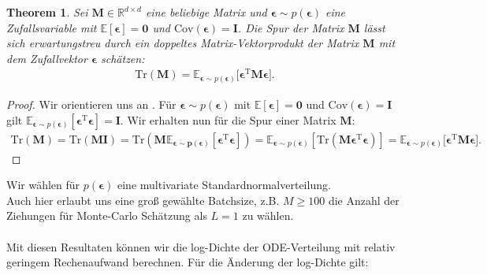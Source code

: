 \documentclass[12pt]{article}
\newcommand{\E}{\mathbb{E}}
\newtheorem{theorem}{Theorem}
\begin{document}
	\begin{theorem}%
		Sei $\mathbf{M}\in \mathbb{R}^{d \times d}$ eine beliebige Matrix und $\boldsymbol\epsilon \sim p(\boldsymbol\epsilon)$ eine Zufallsvariable mit $\E[\boldsymbol\epsilon] = \mathbf{0}$ und $\mathrm{Cov}(\boldsymbol\epsilon) =\mathbf{I}$. Die Spur der Matrix $\mathbf{M}$ lässt sich erwartungstreu durch ein doppeltes Matrix-Vektorprodukt der Matrix  $\mathbf{M}$ mit dem Zufallvektor $\boldsymbol\epsilon$ schätzen:
		\begin{align*}
		\mathrm{Tr}(\mathbf{M}) =
		\E_{\boldsymbol\epsilon \sim p(\boldsymbol\epsilon)}\big[\boldsymbol\epsilon^\mathrm{T} \mathbf{M} \boldsymbol\epsilon \big].
		\end{align*}
	\end{theorem}
	\begin{proof} Wir orientieren uns an \cite{Hutchin}.
		Für $\boldsymbol\epsilon \sim p(\boldsymbol\epsilon)$ mit $\E[\boldsymbol\epsilon] = \mathbf{0}$ und $\mathrm{Cov}(\boldsymbol\epsilon) =\mathbf{I}$ gilt $\E_{\boldsymbol\epsilon\sim p(\boldsymbol\epsilon)}[\boldsymbol\epsilon^\mathrm{T}\boldsymbol\epsilon] = \mathbf{I}.$ Wir erhalten nun für die Spur einer Matrix $\mathbf{M}$:
		\begin{align*}
		\mathrm{Tr}(\mathbf{M}) = \mathrm{Tr}(\mathbf{MI}) = \mathrm{Tr}(\mathbf{M\E_{\boldsymbol\epsilon\sim p(\boldsymbol\epsilon)}[\boldsymbol\epsilon^\mathrm{T}\boldsymbol\epsilon]}) = \E_{\boldsymbol\epsilon\sim p(\boldsymbol\epsilon)}[\mathrm{Tr}(\mathbf{M}\boldsymbol\epsilon^\mathrm{T}\boldsymbol\epsilon)] =
		\E_{\boldsymbol\epsilon \sim p(\boldsymbol\epsilon)}\big[\boldsymbol\epsilon^\mathrm{T} \mathbf{M} \boldsymbol\epsilon \big].
		\end{align*}
	\end{proof}
	Wir wählen für $p(\boldsymbol\epsilon)$ eine multivariate Standardnormalverteilung.\\
	Auch hier erlaubt uns eine groß gewählte Batchsize, z.B. $M\ge100$ die Anzahl der Ziehungen für Monte-Carlo Schätzung als $L=1$ zu wählen.\\
	\\
	Mit diesen Resultaten können wir die log-Dichte der ODE-Verteilung mit relativ geringem Rechenaufwand berechnen.
	Für die Änderung der log-Dichte gilt:
\end{document}
